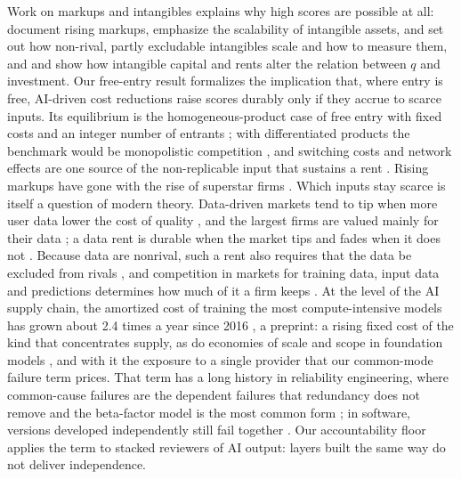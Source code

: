 Work on markups and intangibles explains why high scores are possible at all: \citet{deloecker2020rise} document rising markups, \citet{haskel2017capitalism} emphasize the scalability of intangible assets, \citet{crouzet2022economics} and \citet{corrado2022intangible} set out how non-rival, partly excludable intangibles scale and how to measure them, and \citet{peters2017intangible} and \citet{crouzet2023rents} show how intangible capital and rents alter the relation between $q$ and investment. Our free-entry result formalizes the implication that, where entry is free, AI-driven cost reductions raise scores durably only if they accrue to scarce inputs. Its equilibrium is the homogeneous-product case of free entry with fixed costs and an integer number of entrants \citep{mankiw1986free}; with differentiated products the benchmark would be monopolistic competition \citep{dixit1977monopolistic}, and switching costs and network effects are one source of the non-replicable input that sustains a rent \citep{farrell2007coordination}. Rising markups have gone with the rise of superstar firms \citep{autor2020fall}. Which inputs stay scarce is itself a question of modern theory. Data-driven markets tend to tip when more user data lower the cost of quality \citep{prufer2021competing}, and the largest firms are valued mainly for their data \citep{farboodi2023data}; a data rent is durable when the market tips and fades when it does not \citep[see also][]{hagiu2023data}. Because data are nonrival, such a rent also requires that the data be excluded from rivals \citep{jones2020nonrivalry}, and competition in markets for training data, input data and predictions determines how much of it a firm keeps \citep{gans2026market}. At the level of the AI supply chain, the amortized cost of training the most compute-intensive models has grown about 2.4 times a year since 2016 \citep{cottier2024rising}, a preprint: a rising fixed cost of the kind that concentrates supply, as do economies of scale and scope in foundation models \citep{korinek2025concentrating}, and with it the exposure to a single provider that our common-mode failure term prices. That term has a long history in reliability engineering, where common-cause failures are the dependent failures that redundancy does not remove \citep{mosleh1989nureg4780,mosleh1998nureg5485} and the beta-factor model is the most common form \citep{hokstad2008common}; in software, versions developed independently still fail together \citep{eckhardt1985theoretical,littlewood1989conceptual,knight1986experimental}. Our accountability floor applies the term to stacked reviewers of AI output: layers built the same way do not deliver independence.

